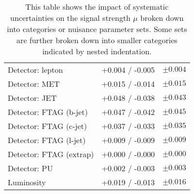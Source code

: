 \begin{table}[hb]
\begin{tabular}{lrr}
    \:\:\:\: Detector: lepton         & +0.004 / -0.005 & $ \pm 0.004 $ \\
    \:\:\:\: Detector: MET            & +0.015 / -0.014 & $ \pm 0.015 $ \\
    \:\:\:\: Detector: JET            & +0.048 / -0.038 & $ \pm 0.043 $ \\
    \:\:\:\: Detector: FTAG (b-jet)   & +0.047 / -0.042 & $ \pm 0.045 $ \\
    \:\:\:\: Detector: FTAG (c-jet)   & +0.037 / -0.033 & $ \pm 0.035 $ \\
    \:\:\:\: Detector: FTAG (l-jet)   & +0.009 / -0.009 & $ \pm 0.009 $ \\
    \:\:\:\: Detector: FTAG (extrap)  & +0.000 / -0.000 & $ \pm 0.000 $ \\
    \:\:\:\: Detector: PU             & +0.002 / -0.003 & $ \pm 0.003 $ \\
    \:\:\:\: Luminosity               & +0.019 / -0.013 & $ \pm 0.016 $ \\
    \bottomrule
  \end{tabular}
\caption{This table shows the impact of systematic uncertainties on the signal
  strength $\mu$ broken down into categories or nuisance parameter sets. Some
  sets are further broken down into smaller categories indicated by nested
  indentation.}
\label{tab:breakdown_012L_MVAVH}
\end{table}